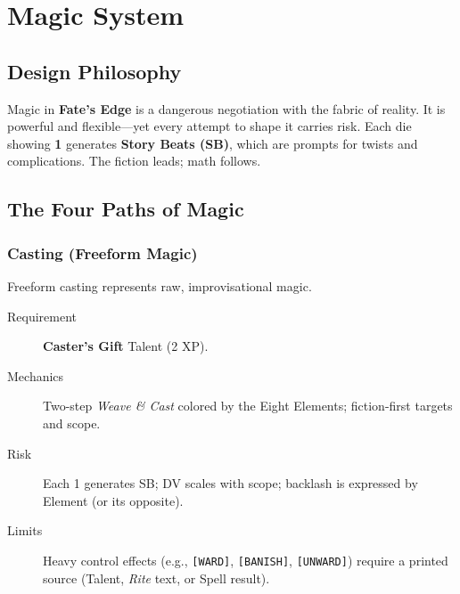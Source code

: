 \chapter{Magic System}
\label{chap:magic-system}

\section{Design Philosophy}
\label{sec:magic-philosophy}

Magic in \textbf{Fate's Edge} is a dangerous negotiation with the fabric of reality. It is powerful and flexible—yet every attempt to shape it carries risk. Each die showing \textbf{1} generates \textbf{Story Beats (SB)}, which are prompts for twists and complications. The fiction leads; math follows.

\section{The Four Paths of Magic}
\label{sec:four-paths}

\subsection{Casting (Freeform Magic)}
\label{subsec:freeform-casting}

Freeform casting represents raw, improvisational magic.

\begin{description}
\item[Requirement] \textbf{Caster's Gift} Talent (2 XP).
\item[Mechanics] Two-step \emph{Weave \& Cast} colored by the Eight Elements; fiction-first targets and scope.
\item[Risk] Each 1 generates SB; DV scales with scope; backlash is expressed by Element (or its opposite).
\item[Limits] Heavy control effects (e.g., \texttt{[WARD]}, \texttt{[BANISH]}, \texttt{[UNWARD]}) require a printed source (Talent, \emph{Rite} text, or Spell result).
\end{description}

